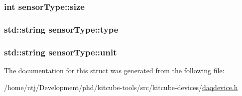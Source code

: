 \hypertarget{structsensorType_ac4e84f68987ad6ce6d8b1b1736ed2f44}{
\subsubsection[{size}]{\setlength{\rightskip}{0pt plus 5cm}int sensor\-Type\-::size}}\label{structsensorType_ac4e84f68987ad6ce6d8b1b1736ed2f44}
\hypertarget{structsensorType_a8e29e9b36a7bffe8ed80b4760266fa70}{
\subsubsection[{type}]{\setlength{\rightskip}{0pt plus 5cm}std\-::string sensor\-Type\-::type}}\label{structsensorType_a8e29e9b36a7bffe8ed80b4760266fa70}
\hypertarget{structsensorType_aa79c2e4762be819e51b68fabed355c70}{
\subsubsection[{unit}]{\setlength{\rightskip}{0pt plus 5cm}std\-::string sensor\-Type\-::unit}}\label{structsensorType_aa79c2e4762be819e51b68fabed355c70}


The documentation for this struct was generated from the following file\-:\begin{DoxyCompactItemize}
\item 
/home/ntj/\-Development/phd/kitcube-\/tools/src/kitcube-\/devices/\hyperlink{daqdevice_8h}{daqdevice.\-h}\end{DoxyCompactItemize}
